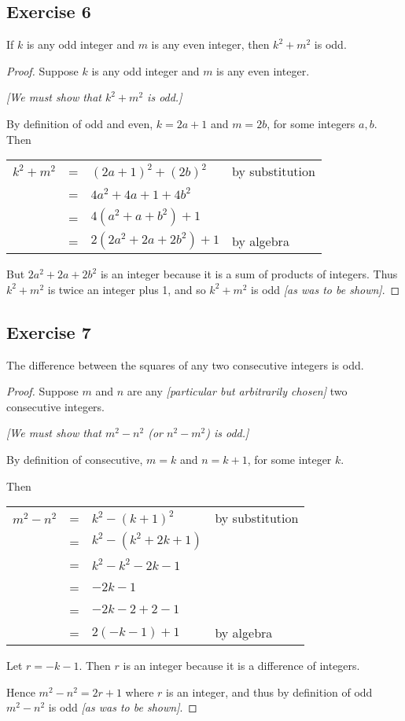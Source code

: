 \documentclass[14pt]{extarticle}
\begin{document}
\subsection{Exercise 6}
If $k$ is any odd integer and $m$ is any even integer, then $k^2 + m^2$ is odd.

\begin{proof}
Suppose $k$ is any odd integer and $m$ is any even integer. 

{\it [We must show that $k^2 + m^2$ is odd.]}

By definition of odd and even, $k = 2a+1$ and $m = 2b$, for some integers $a, b$. Then

\begin{center}
\begin{tabular}{rcll}
$k^2+m^2$ & = & $(2a+1)^2+(2b)^2$ & \color{cyan} by substitution \\
& = & $4a^2+4a+1+4b^2$ & \\
& = & $4(a^2+a+b^2)+1$ & \\
& = & $2(2a^2+2a+2b^2)+1$ & \color{cyan} by algebra \\
\end{tabular}
\end{center}

But $2a^2+2a+2b^2$ is an integer because it is a sum of products of integers. Thus $k^2+m^2$ is twice an integer plus 1, and so $k^2+m^2$ is odd {\it [as was to be shown]}.
\end{proof}

\subsection{Exercise 7}
The difference between the squares of any two consecutive integers is odd.

\begin{proof}
Suppose $m$ and $n$ are any {\it [particular but arbitrarily chosen]} two consecutive integers. 

{\it [We must show that $m^2-n^2$ (or $n^2-m^2$) is odd.]}

By definition of consecutive, $m = k$ and $n = k+1$, for some integer $k$. 

Then

\begin{center}
\begin{tabular}{rcll}
$m^2-n^2$ & = & $k^2 - (k+1)^2$ & \color{cyan} by substitution \\
& = & $k^2 - (k^2 + 2k + 1)$ & \\
& = & $k^2 - k^2 - 2k - 1$ & \\
& = & $-2k-1$ & \\
& = & $-2k-2+2-1$ & \\
& = & $2(-k-1)+1$ & \color{cyan} by algebra \\
\end{tabular}
\end{center}

Let $r = -k-1$. Then $r$ is an integer because it is a difference of integers. 

Hence $m^2 - n^2 = 2r+1$ where $r$ is an integer, and thus by definition of odd $m^2-n^2$ is odd {\it [as was to be shown]}.
\end{proof}
\end{document}
